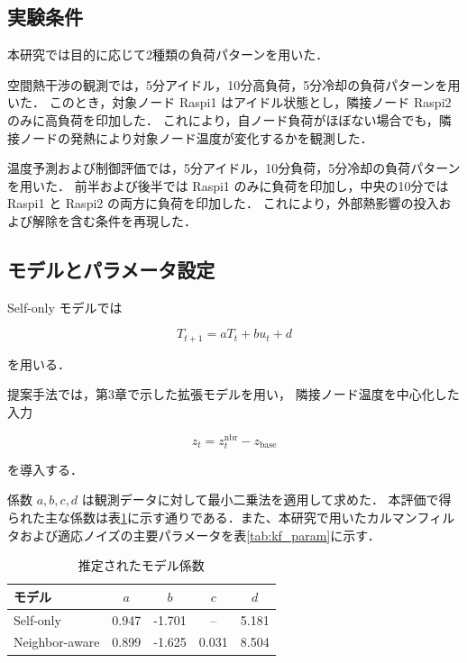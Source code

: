 \documentclass[techrep]{ipsj}
\begin{document}
\subsection{実験条件}

本研究では目的に応じて2種類の負荷パターンを用いた．

空間熱干渉の観測では，5分アイドル，10分高負荷，5分冷却の負荷パターンを用いた．
このとき，対象ノード Raspi1 はアイドル状態とし，隣接ノード Raspi2 のみに高負荷を印加した．
これにより，自ノード負荷がほぼない場合でも，隣接ノードの発熱により対象ノード温度が変化するかを観測した．

温度予測および制御評価では，5分アイドル，10分負荷，5分冷却の負荷パターンを用いた．
前半および後半では Raspi1 のみに負荷を印加し，中央の10分では Raspi1 と Raspi2 の両方に負荷を印加した．
これにより，外部熱影響の投入および解除を含む条件を再現した．

\subsection{モデルとパラメータ設定}

Self-only モデルでは

\begin{equation}
T_{t+1} = aT_t + bu_t + d
\end{equation}

を用いる．

提案手法では，第3章で示した拡張モデルを用い，
隣接ノード温度を中心化した入力

\begin{equation}
z_t = z_t^{\mathrm{nbr}} - z_{\mathrm{base}}
\end{equation}

を導入する．

係数 $a,b,c,d$ は観測データに対して最小二乗法を適用して求めた．
本評価で得られた主な係数は表\ref{tab:model_param}に示す通りである．また、本研究で用いたカルマンフィルタおよび適応ノイズの主要パラメータを表\ref{tab:kf_param}に示す．

\begin{table}[tbp]
\centering
\caption{推定されたモデル係数}
\label{tab:model_param}
\begin{tabular}{lcccc}
\hline
モデル & $a$ & $b$ & $c$ & $d$ \\
\hline
Self-only & 0.947 & -1.701 & -- & 5.181 \\
Neighbor-aware & 0.899 & -1.625 & 0.031 & 8.504 \\
\hline
\end{tabular}
\end{table}
\end{document}
